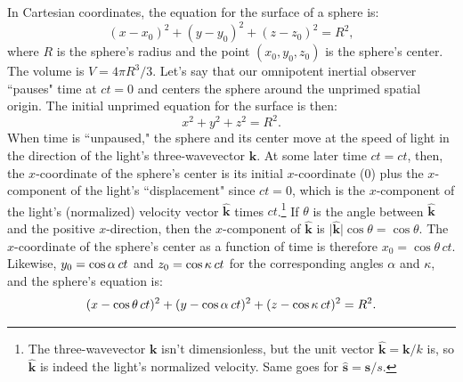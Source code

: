 \documentclass[12pt]{article}
\renewcommand{\vv}[1]{\mathbf{#1}}
\begin{document}
In Cartesian coordinates, the equation for the surface of a sphere is:
\begin{equation*}
(x - x_0)^2 + (y - y_0)^2 + (z - z_0)^2 = R^2,
\end{equation*}
where $R$ is the sphere's radius and the point $(x_0, y_0, z_0)$ is the sphere's center. The volume is $V = 4 \pi R^3 / 3$. Let's say that our omnipotent inertial observer ``pauses" time at ${ct = 0}$ and centers the sphere around the unprimed spatial origin. The initial unprimed equation for the surface is then:
\begin{equation*}
x^2 + y^2 + z^2 = R^2.
\end{equation*}
When time is ``unpaused," the sphere and its center move at the speed of light in the direction of the light's three-wavevector $\vv k$. At some later time $ct = ct$, then, the $x$-coordinate of the sphere's center is its initial $x$-coordinate ($0$) plus the $x$-component of the light's ``displacement" since $ct = 0$, which is the $x$-component of the light's (normalized) velocity vector $\vv{\hat{k}}$ times $ct$.\footnote{The three-wavevector $\vv k$ isn't dimensionless, but the unit vector $\vv{\hat{k}} = \vv k / k$ is, so $\vv{\hat{k}}$ is indeed the light's normalized velocity. Same goes for $\vv{\hat s} = \vv s / s$.} If $\theta$ is the angle between $\vv{\hat{k}}$ and the positive $x$-direction, then the $x$-component of $\vv{\hat{k}}$ is $\vert \vv{\hat{k}} \vert \cos{\theta} = \cos{\theta}$. The $x$-coordinate of the sphere's center as a function of time is therefore $x_0 = \cos{\theta} \, ct$. Likewise, $y_0 = \cos{\alpha} \, \mkern.5mu ct$ and $z_0 = \cos{\kappa} \, \mkern.5mu ct$ for the corresponding angles $\alpha$ and $\kappa$, and the sphere's equation is:
\begin{equation*}
(x - \cos{\theta} \, ct)^2 + (y - \cos{\alpha} \, \mkern.5mu ct)^2 + (z - \cos{\kappa} \, \mkern.5mu ct)^2 = R^2 .
\end{equation*}
\end{document}

